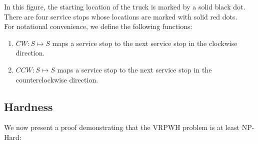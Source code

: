 \documentclass[12pt]{scrartcl}
\begin{document}
\noindent In this figure, the starting location of the truck is marked by a solid black dot. There are four service stops whose locations are marked with solid red dots.\\


For notational convenience, we define the following functions:

\begin{enumerate}
    \item $CW : S \mapsto S$ maps a service stop to the next service stop in the clockwise direction. 
    \item $CCW : S \mapsto S$ maps a service stop to the next service stop in the counterclockwise direction.
\end{enumerate}




\iffalse
Another interesting situation is when the vehicle's route is a line. We can model this situation by having the vehicle start at a single point on the real number line. Service stops are scattered along the number line. The vehicle travels towards the end of the number line while servicing some subset of the customers. Afterwards, it travels back to where it started on the number line, possibly servicing a different subset of customers on its way back. \\

The last two cases that are interesting to consider are when the underlying graph that the vehicle traverses is a tree, and the general case in which there is no pre-defined structure for the distribution of the service stops. In either of these cases, we can represent the vehicle's starting point and the service stops it must visit as vertices in a graph. The distances between any two vertices is represented by the weight between the two edges. \\
\fi

\subsection{Hardness}
We now present a proof demonstrating that the VRPWH problem is at least NP-Hard:
\end{document}
